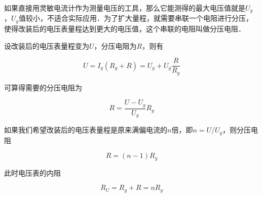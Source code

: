 如果直接用灵敏电流计作为测量电压的工具，那么它能测得的最大电压值就是$U_g$，$U_g$值较小，不适合实际应用．为了扩大量程，就需要串联一个电阻进行分压，使得改装后的电压表量程达到更大的电压值，这个串联的电阻叫做分压电阻．

设改装后的电压表量程变为$U$，分压电阻为$R$，则有

\begin{equation}
U=I_g(R_g+R)=U_g+U_g\frac{R}{R_g}
\end{equation}

可算得需要的分压电阻为

\begin{equation}
R=\frac{U-U_g}{U_g}R_g
\end{equation}

如果我们希望改装后的电压表量程是原来满偏电流的$n$倍，即$n=U/U_g$，则分压电阻

\begin{equation}
R=(n-1)R_g
\end{equation}

此时电压表的内阻

\begin{equation}
R_U=R_g+R=nR_g
\end{equation}
